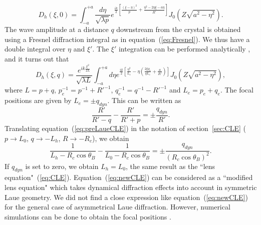 \documentclass[preprint]{iucr}              %
\newcommand{\inred}[1]{{\color{red}#1}}
\begin{document}
\begin{equation}\label{eq:blabla}
    D_h(\xi,0)=\int_{-a}^{+a}\frac{d\eta}{\sqrt{\lambda p}}
    e^{\frac{ik}{2}\left[\frac{(\xi-\eta)^2}{p}+\frac{\eta^2-2\eta\xi-a\eta}{R'}\right]}
    J_0(Z\sqrt{a^2-\eta^2}).
\end{equation}
The wave amplitude at a distance $q$ downstream from the crystal is obtained using \inred{a Fresnel diffraction integral as in} equation~(\ref{eq:Fresnel}). We thus have a double integral over $\eta$ and $\xi'$. The $\xi'$ integration can be performed analytically \cite{GuigayFerrero2013}, and it turns out that
\begin{equation}
\label{eq:Dhpropagated}
    D_h(\xi,q)=
    \frac{e^{i k \frac{\xi^2}{2L}}}{\sqrt{\lambda L}}
    \int_{-a}^{+a} d\eta
    e^{\frac{ik}{2}
    [\frac{\eta^2}{L_e}-\eta(
    \frac{2\xi q_e}{q L_e}+
    \frac{a}{R'}
    )]}
    J_0(Z\sqrt{a^2-\eta^2}),
\end{equation}
where $L=p+q$, $p_e^{-1}=p^{-1}+R'^{-1}$, $q_e^{-1}=q^{-1}-R'^{-1}$ and $L_e=p_e+q_e$. The focal positions are given by $L_{e}=\pm q_{dyn}$.
This can be written as
\begin{equation}
\label{eq:preLaueCLE}
    \frac{R'}{R'-q} - \frac{R'}{R' + p} = \pm \frac{q_{dyn}}{R'}.
\end{equation}
Translating equation~(\ref{eq:preLaueCLE}) in the notation of section~\ref{sec:CLE} ($p \to L_0$, $q \to -L_h$, $R \to -R_c$), we obtain
\begin{equation}
\label{eq:newCLE}
    \frac{1}{L_h-R_c \cos\theta_B} -
    \frac{1}{L_0 - R_c \cos\theta_B} =
    \pm \frac{q_{dyn}}{(R_c \cos\theta_B)^2}.
\end{equation}
If $q_{dyn}$ is set to zero, we obtain $L_h=L_0$, the same result as the ``lens equation"~(\ref{eq:CLE}).
Equation~(\ref{eq:newCLE}) can be considered as a ``modified lens equation" which takes dynamical diffraction effects into account in symmetric Laue geometry.
We \inred{did} not find a close expression like equation~(\ref{eq:newCLE}) for the general case of asymmetrical Laue diffraction. However, numerical simulations can be done to obtain the focal positions \cite{Nesterets,GuigayFerrero2016}.
\end{document}
